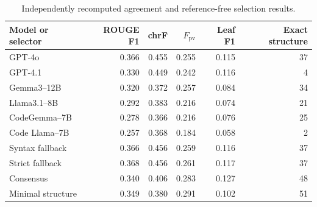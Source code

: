 \begin{table}[H]
\centering\small
\caption{Independently recomputed agreement and reference-free selection results.}
\label{tab:rawmetrics}
\begin{tabular}{@{}lrrrrr@{}}
\toprule
Model or selector & ROUGE F1 & chrF & $F_{\mathrm{pv}}$ & Leaf F1 & Exact structure\\
\midrule
GPT-4o & 0.366 & 0.455 & 0.255 & 0.115 & 37\\
GPT-4.1 & 0.330 & 0.449 & 0.242 & 0.116 & 4\\
Gemma3--12B & 0.320 & 0.372 & 0.257 & 0.084 & 34\\
Llama3.1--8B & 0.292 & 0.383 & 0.216 & 0.074 & 21\\
CodeGemma--7B & 0.278 & 0.366 & 0.216 & 0.076 & 25\\
Code Llama--7B & 0.257 & 0.368 & 0.184 & 0.058 & 2\\
Syntax fallback & 0.366 & 0.456 & 0.259 & 0.116 & 37\\
Strict fallback & 0.368 & 0.456 & 0.261 & 0.117 & 37\\
Consensus & 0.340 & 0.406 & 0.283 & 0.127 & 48\\
Minimal structure & 0.349 & 0.380 & 0.291 & 0.102 & 51\\
\bottomrule
\end{tabular}
\par\vspace{0.3em}{\footnotesize Lexical means use 1,318 examples. Structural means and exact counts use the same 1,293 valid references, assigning zero to invalid generated candidates. Leaf F1 removes the shared root-kind feature. Selectors use only candidate text.}
\end{table}
